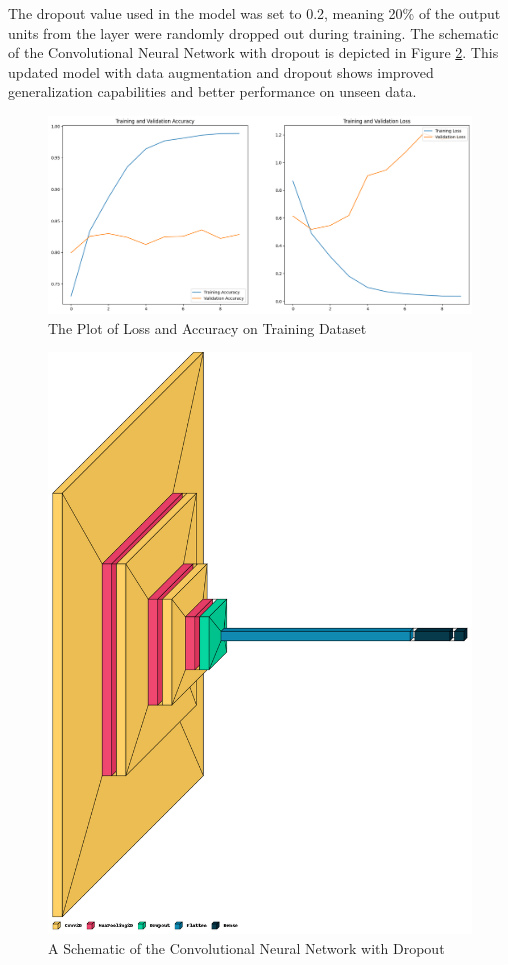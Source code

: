 \documentclass[11pt,a4paper]{article}
\begin{document}
\noindent The dropout value used in the model was set to 0.2, meaning 20\% of the output units from the layer were randomly dropped out during training. The schematic of the Convolutional Neural Network with dropout is depicted in Figure \ref{dropout_schema}. This updated model with data augmentation and dropout shows improved generalization capabilities and better performance on unseen data.

 \begin{figure}[h!]
 \centering
  \includegraphics[width=\linewidth]{training_valid_plot.png}
  \caption{The Plot of Loss and Accuracy on Training Dataset}
  \label{cnn_loss}
\end{figure}

 \begin{figure}[h!]
 \centering
  \includegraphics[width=0.85\linewidth]{dropout_schema.png}
  \caption{A Schematic of the Convolutional Neural Network with Dropout}
  \label{dropout_schema}
\end{figure}
\end{document}
